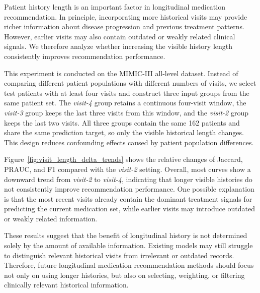 \documentclass[manuscript,review]{acmart}
\begin{document}
Patient history length is an important factor in longitudinal medication recommendation. In principle, incorporating more historical visits may provide richer information about disease progression and previous treatment patterns. However, earlier visits may also contain outdated or weakly related clinical signals. We therefore analyze whether increasing the visible history length consistently improves recommendation performance.

This experiment is conducted on the MIMIC-III all-level dataset. Instead of comparing different patient populations with different numbers of visits, we select test patients with at least four visits and construct three input groups from the same patient set. The \textit{visit-4} group retains a continuous four-visit window, the \textit{visit-3} group keeps the last three visits from this window, and the \textit{visit-2} group keeps the last two visits. All three groups contain the same 162 patients and share the same prediction target, so only the visible historical length changes. This design reduces confounding effects caused by patient population differences.

Figure~\ref{fig:visit_length_delta_trends} shows the relative changes of Jaccard, PRAUC, and F1 compared with the \textit{visit-2} setting. Overall, most curves show a downward trend from \textit{visit-2} to \textit{visit-4}, indicating that longer visible histories do not consistently improve recommendation performance. One possible explanation is that the most recent visits already contain the dominant treatment signals for predicting the current medication set, while earlier visits may introduce outdated or weakly related information.

These results suggest that the benefit of longitudinal history is not determined solely by the amount of available information. Existing models may still struggle to distinguish relevant historical visits from irrelevant or outdated records. Therefore, future longitudinal medication recommendation methods should focus not only on using longer histories, but also on selecting, weighting, or filtering clinically relevant historical information.


\end{document}
